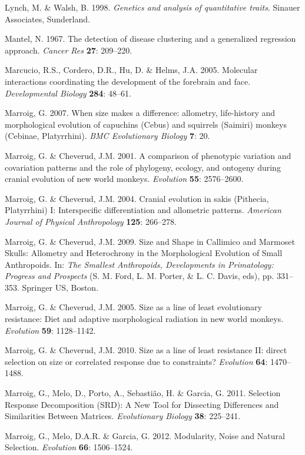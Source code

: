 \documentclass[12pt,twoside]{report}
\begin{document}
Lynch, M. \& Walsh, B. 1998. \emph{Genetics and analysis of quantitative
traits}. Sinauer Associates, Sunderland.

Mantel, N. 1967. The detection of disease clustering and a generalized
regression approach. \emph{Cancer Res} \textbf{27}: 209--220.

Marcucio, R.S., Cordero, D.R., Hu, D. \& Helms, J.A. 2005. Molecular
interactions coordinating the development of the forebrain and face.
\emph{Developmental Biology} \textbf{284}: 48--61.

Marroig, G. 2007. When size makes a difference: allometry, life-history
and morphological evolution of capuchins (Cebus) and squirrels (Saimiri)
monkeys (Cebinae, Platyrrhini). \emph{BMC Evolutionary Biology}
\textbf{7}: 20.

Marroig, G. \& Cheverud, J.M. 2001. A comparison of phenotypic variation
and covariation patterns and the role of phylogeny, ecology, and
ontogeny during cranial evolution of new world monkeys. \emph{Evolution}
\textbf{55}: 2576--2600.

Marroig, G. \& Cheverud, J.M. 2004. Cranial evolution in sakis
(Pithecia, Platyrrhini) I: Interspecific differentiation and allometric
patterns. \emph{American Journal of Physical Anthropology} \textbf{125}:
266--278.

Marroig, G. \& Cheverud, J.M. 2009. Size and Shape in Callimico and
Marmoset Skulls: Allometry and Heterochrony in the Morphological
Evolution of Small Anthropoids. In: \emph{The Smallest Anthropoids,
Developments in Primatology: Progress and Prospects} (S. M. Ford, L. M.
Porter, \& L. C. Davis, eds), pp. 331--353. Springer US, Boston.

Marroig, G. \& Cheverud, J.M. 2005. Size as a line of least evolutionary
resistance: Diet and adaptive morphological radiation in new world
monkeys. \emph{Evolution} \textbf{59}: 1128--1142.

Marroig, G. \& Cheverud, J.M. 2010. Size as a line of least resistance
II: direct selection on size or correlated response due to constraints?
\emph{Evolution} \textbf{64}: 1470--1488.

Marroig, G., Melo, D., Porto, A., Sebastião, H. \& Garcia, G. 2011.
Selection Response Decomposition (SRD): A New Tool for Dissecting
Differences and Similarities Between Matrices. \emph{Evolutionary
Biology} \textbf{38}: 225--241.

Marroig, G., Melo, D.A.R. \& Garcia, G. 2012. Modularity, Noise and
Natural Selection. \emph{Evolution} \textbf{66}: 1506--1524.
\end{document}
